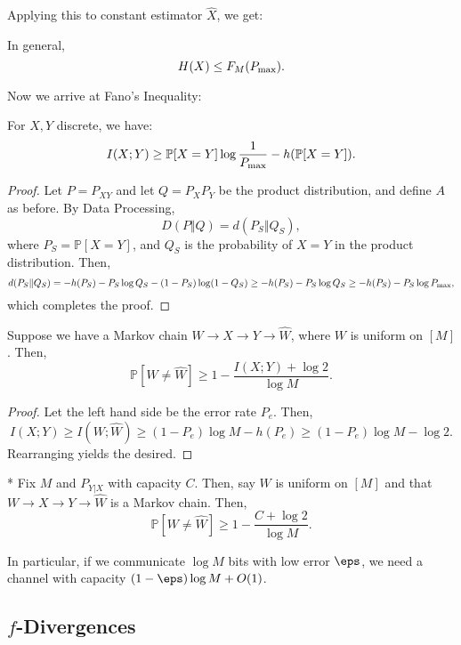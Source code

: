 Applying this to constant estimator $\hat X$, we get:

\begin{cor}
	In general, \[
		H(X) \leq F_M(P_{\textnormal{max}}).
	\]
\end{cor}

Now we arrive at Fano's Inequality:

\begin{thm}
	For $X,Y$ discrete, we have: \[
		I(X;Y) \geq \mathbb P[X = Y] \log \frac{1}{P_{\textnormal{max}}} - h(\mathbb P[X= Y]).
	\]
\end{thm}

\begin{proof}
	Let $P = P_{XY}$ and let $Q = P_XP_Y$ be the product distribution, and define $A$ as before. 
	By Data Processing, \[
		D(P\Vert Q) = d(P_S\Vert Q_S),
	\]
	where $P_S = \mathbb P[X = Y]$, and $Q_S$ is the probability of $X=Y$ in the product distribution.
	Then, \[
		d(P_S\Vert Q_S) = -h(P_S) - P_S\log Q_S - (1-P_S) \log (1-Q_S) \geq -h(P_S) - P_S\log Q_S \geq - h(P_S) - P_S \log P_{\textnormal{max}},
	\]
	which completes the proof.
\end{proof}

\begin{cor}
	Suppose we have a Markov chain $W\to X\to Y\to \hat W$, where $W$ is uniform on $[M]$. Then, \[
		\mathbb P[W \neq \hat W] \geq 1- \frac{I(X;Y) + \log 2}{\log M}.
	\]
\end{cor}

\begin{proof}
	Let the left hand side be the error rate $P_e$. Then, \[
		I(X;Y) \geq I(W;\hat W) \geq (1-P_e)\log M - h(P_e) \geq (1-P_e) \log M - \log 2.
	\]
	Rearranging yields the desired.
\end{proof}

\begin{cor}*
	Fix $M$ and $P_{Y|X}$ with capacity $C$. Then, say $W$ is uniform on $[M]$ and that $W\to X\to Y\to \hat W$ is a Markov chain. Then, \[
		\mathbb P[W\neq \hat W] \geq 1-\frac{C + \log 2}{\log M}.
	\]
\end{cor}

In particular, if we communicate $\log M$ bits with low error $\eps$, we need a channel with capacity $(1-\eps) \log M + O(1)$.

\subsection{$f$-Divergences}

